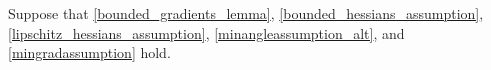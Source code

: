 Suppose that \cref{bounded_gradients_lemma}, \cref{bounded_hessians_assumption}, \cref{lipschitz_hessians_assumption}, \cref{minangleassumption_alt}, and \cref{mingradassumption} hold.
